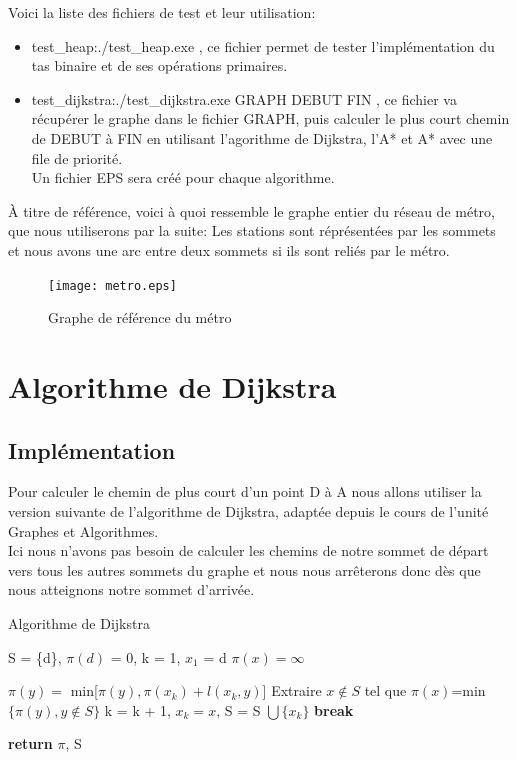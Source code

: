 \documentclass{article}
\begin{document}
Voici la liste des fichiers de test et leur utilisation:
\begin{itemize}
	\item test\_heap:./test\_heap.exe , ce fichier permet de tester l'implémentation du tas
		  binaire et de ses opérations primaires.
	\item test\_dijkstra:./test\_dijkstra.exe GRAPH DEBUT FIN , ce fichier va récupérer
		  le graphe dans le fichier GRAPH, puis calculer le plus court chemin de DEBUT à FIN
		  en utilisant l'agorithme de Dijkstra, l'A* et A* avec une file de priorité.\\
		  Un fichier EPS sera créé pour chaque algorithme.\\
\end{itemize}

À titre de référence, voici à quoi ressemble le graphe entier du réseau de métro, que nous
utiliserons par la suite:
Les stations sont réprésentées par les sommets et nous avons une arc entre deux sommets
si ils sont reliés par le métro.

\begin{figure}[!hbt]
	\centering
	\texttt{[image: metro.eps]}
	\caption{Graphe de référence du métro}
	\label{metro}
\end{figure}

\clearpage
\section{Algorithme de Dijkstra}
\subsection{Implémentation}

Pour calculer le chemin de plus court d'un point D à A nous allons utiliser 
la version suivante de l'algorithme de Dijkstra, adaptée depuis le cours de 
l'unité Graphes et Algorithmes.\\

Ici nous n'avons pas besoin de calculer les chemins de notre sommet de départ
vers tous les autres sommets du graphe et nous nous arrêterons donc dès
que nous atteignons notre sommet d'arrivée.

\begin{algorithm}
\caption{Algorithme de Dijkstra}\label{dijkstra}
\begin{algorithmic}[1]
	\State S = \{d\}, $\pi(d)$ = 0, k = 1, $x_1$ = d
		\State $\pi(x) = \infty$
	\EndFor
	
			\State $\pi(y) = $ min[$\pi(y), \pi(x_k) + l(x_k, y)$]
		\EndFor
		\State Extraire $x \not\in S$ tel que $\pi(x)$=min$\{\pi(y), y \not\in S\}$
		\State k = k + 1, $x_k = x$, S = S $\bigcup \{x_k\}$
			\State \textbf{break}
		\EndIf
	\EndWhile
	
	\State \textbf{return} $\pi$, S
\EndProcedure
\end{algorithmic}
\end{algorithm}
\end{document}
